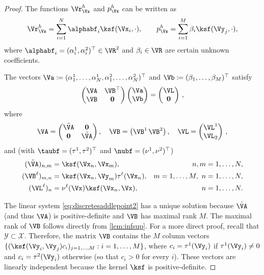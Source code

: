 \documentclass{siamart1116}
\numberwithin{theorem}{section}
\begin{document}
\begin{proof}
The functions $\Vr_\Vx^h$ and $p_\Vx^h$ can be written as
\begin{equation}
\Vr_\Vx^h =\sum_{i=1}^N \alphabf_{i}\ksf(\Vx_i, \cdot), 
\qquad  p_\Vx^h = \sum_{i=1}^M \beta_{i} \ksf(\Vy_j, \cdot),
\end{equation}
where $\alphabf_{i}=(\alpha_i^1,\alpha_i^2)^\top\in\VR^2$ and $\beta_{i}\in \VR$ are certain unknown coefficients.

The vectors  $\Va \coloneqq (\alpha_{1}^1,\ldots, \alpha_{N}^1, \alpha_{1}^2,\ldots, \alpha_{N}^2)^\top$
and $\Vb \coloneqq (\beta_1,\ldots, \beta_M)^\top$ satisfy
\begin{equation}\label{eq:discretesaddlepoint2}
\begin{pmatrix}
	\VA& \VB^\top\\
	\VB & \bold{0} 	
\end{pmatrix}
\begin{pmatrix}
	\Va\\ \Vb
\end{pmatrix} = \begin{pmatrix}
\VL\\\bold{0}
\end{pmatrix}\,,
\end{equation}
where \begin{equation}\label{ea:VA}
\VA = \begin{pmatrix}
	\tilde\VA & \bold{0}\\
	\bold{0}    & \tilde\VA
\end{pmatrix}, \quad \VB = \begin{pmatrix}
\VB^1\,\VB^2
\end{pmatrix}, \quad \VL = \begin{pmatrix}
\VL^1\\
\VL_2
\end{pmatrix}\,,
\end{equation}
and (with $\taubf = (\tau^1, \tau^2)^\top$ and  $\nubf = (\nu^1, \nu^2)^\top$)
\begin{align}
\label{eq:Ah2}
(\tilde\VA)_{n,m} &= \ksf(\Vx_n,\Vx_m), &  n, m=1,\ldots, N,\\
\label{eq:Bh2}
(\VB^\ell)_{m,n}   &=  \ksf(\Vx_n,\Vy_m)\tau^\ell(\Vx_n),& m = 1,\ldots, M,\ n=1,\ldots, N, \\\
\label{eq:Fh2}
(\VL^\ell)_n &= \nu^\ell(\Vx) \ksf(\Vx_n,\Vx) ,& \quad n=1,\ldots, N.
\end{align}

The linear system \cref{eq:discretesaddlepoint2} has a unique solution because
$\tilde\VA$ (and thus $\VA$) is positive-definite and $\VB$ has maximal rank  $M$.
The maximal rank of $\VB$ follows directly from \cref{lem:infsup}. For a more
direct proof, recall that $\mathcal Y\subset \mathcal X$.
Therefore, the matrix $\VB$ contains the $M$ column vectors
$\{(\ksf(\Vy_i,\Vy_j)c_i)_{j=1,\ldots, M}:  i=1,\dots, M\}$,
where $c_i = \tau^1(\Vy_i)$ if $\tau^1(\Vy_i)\neq 0$ and
$c_i = \tau^2(\Vy_i)$ otherwise (so that $c_i>0$ for every  $i$). These vectors are
linearly independent because the kernel $\ksf$ is positive-definite.


\end{proof}
\end{document}
